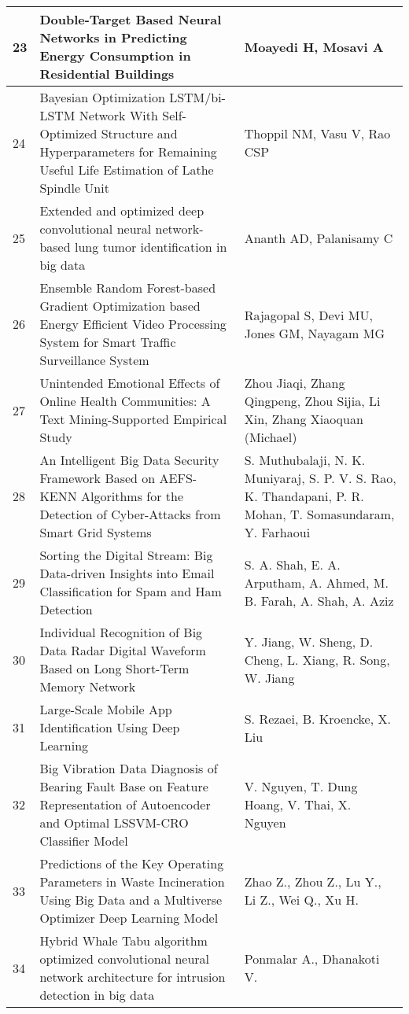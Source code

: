 \begin{longtable}{|p{}|p{}|p{}|}
\hline
23 & Double-Target Based Neural Networks in Predicting Energy Consumption in Residential Buildings & Moayedi H, Mosavi A \\
\hline
24 & Bayesian Optimization LSTM/bi-LSTM Network With Self-Optimized Structure and Hyperparameters for Remaining Useful Life Estimation of Lathe Spindle Unit & Thoppil NM, Vasu V, Rao CSP \\
\hline
25 & Extended and optimized deep convolutional neural network-based lung tumor identification in big data & Ananth AD, Palanisamy C \\
\hline
26 & Ensemble Random Forest-based Gradient Optimization based Energy Efficient Video Processing System for Smart Traffic Surveillance System & Rajagopal S, Devi MU, Jones GM, Nayagam MG \\
\hline
27 & Unintended Emotional Effects of Online Health Communities: A Text Mining-Supported Empirical Study & Zhou Jiaqi, Zhang Qingpeng, Zhou Sijia, Li Xin, Zhang Xiaoquan (Michael) \\
\hline
28 & An Intelligent Big Data Security Framework Based on AEFS-KENN Algorithms for the Detection of Cyber-Attacks from Smart Grid Systems & S. Muthubalaji, N. K. Muniyaraj, S. P. V. S. Rao, K. Thandapani, P. R. Mohan, T. Somasundaram, Y. Farhaoui \\
\hline
29 & Sorting the Digital Stream: Big Data-driven Insights into Email Classification for Spam and Ham Detection & S. A. Shah, E. A. Arputham, A. Ahmed, M. B. Farah, A. Shah, A. Aziz \\
\hline
30 & Individual Recognition of Big Data Radar Digital Waveform Based on Long Short-Term Memory Network & Y. Jiang, W. Sheng, D. Cheng, L. Xiang, R. Song, W. Jiang \\
\hline
31 & Large-Scale Mobile App Identification Using Deep Learning & S. Rezaei, B. Kroencke, X. Liu \\
\hline
32 & Big Vibration Data Diagnosis of Bearing Fault Base on Feature Representation of Autoencoder and Optimal LSSVM-CRO Classifier Model & V. Nguyen, T. Dung Hoang, V. Thai, X. Nguyen \\
\hline
33 & Predictions of the Key Operating Parameters in Waste Incineration Using Big Data and a Multiverse Optimizer Deep Learning Model & Zhao Z., Zhou Z., Lu Y., Li Z., Wei Q., Xu H. \\
\hline
34 & Hybrid Whale Tabu algorithm optimized convolutional neural network architecture for intrusion detection in big data & Ponmalar A., Dhanakoti V. \\

\end{longtable}
